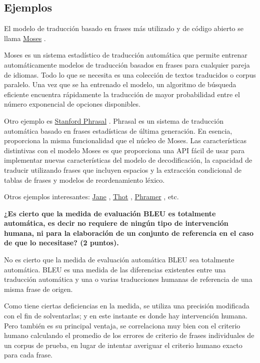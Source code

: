 \documentclass[11pt]{exam}
\begin{document}
\begin{questions}
\section*{Ejemplos}

El modelo de traducción basado en frases más utilizado y de código abierto se llama \href{http://www.statmt.org/moses/}{Moses} .

Moses es un sistema estadístico de traducción automática que permite entrenar automáticamente modelos de traducción basados en frases para cualquier pareja de idiomas. Todo lo que se necesita es una colección de textos traducidos o corpus paralelo. Una vez que se ha entrenado el modelo, un algoritmo de búsqueda eficiente encuentra rápidamente la traducción de mayor probabilidad entre el número exponencial de opciones disponibles.

Otro ejemplo es \href{https://nlp.stanford.edu/phrasal/}{Stanford Phrasal} . Phrasal es un sistema de traducción automática basado en frases estadísticas de última generación. En esencia, proporciona la misma funcionalidad que el núcleo de Moses. Las características distintivas con el modelo Moses es que proporciona una API fácil de usar para implementar nuevas características del modelo de decodificación, la capacidad de traducir utilizando frases que incluyen espacios y la extracción condicional de tablas de frases y modelos de reordenamiento léxico.

Otros ejemplos interesantes: \href{http://www-i6.informatik.rwth-aachen.de/jane/}{Jane} , \href{https://sourceforge.net/projects/thot/}{Thot} , \href{http://www.hlt.utdallas.edu/~marian/phramer/}{Phramer} , etc.

{\bf \question ¿Es cierto que la medida de evaluación BLEU es totalmente automática, es decir no requiere de ningún tipo de intervención humana, ni para la elaboración de un conjunto de referencia en el caso de que lo necesitase? (2 puntos).}

No es cierto que la medida de evaluación automática BLEU sea totalmente automática. BLEU es una medida de las diferencias existentes entre una traducción automática y una o varias traducciones humanas de referencia de una misma frase de origen.

Como tiene ciertas deficiencias en la medida, se utiliza una precisión modificada con el fin de solventarlas; y en este instante es donde hay intervención humana. Pero también es su principal ventaja, se correlaciona muy bien con el criterio humano calculando el promedio de los errores de criterio de frases individuales de un corpus de prueba, en lugar de intentar averiguar el criterio humano exacto para cada frase.


\end{questions}
\end{document}
